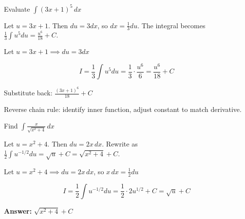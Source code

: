 
\begin{problem}
Evaluate $\displaystyle \int (3x + 1)^5 \, dx$
\end{problem}

\begin{hint}
Let $u = 3x + 1$. Then $du = 3dx$, so $dx = \frac{1}{3}du$. The integral becomes $\frac{1}{3}\int u^5 du = \frac{u^6}{18} + C$.
\end{hint}

\begin{solution}
Let $u = 3x + 1 \implies du = 3dx$

\[
I = \frac{1}{3}\int u^5 du = \frac{1}{3} \cdot \frac{u^6}{6} = \frac{u^6}{18} + C
\]

Substitute back: $\boxed{\frac{(3x+1)^6}{18} + C}$
\end{solution}

\begin{takeaways}
Reverse chain rule: identify inner function, adjust constant to match derivative.
\end{takeaways}

\vspace{1cm}

\begin{problem}
Find $\displaystyle \int \frac{x}{\sqrt{x^2 + 4}} \, dx$
\end{problem}

\begin{hint}
Let $u = x^2 + 4$. Then $du = 2x \, dx$. Rewrite as $\frac{1}{2}\int u^{-1/2} du = \sqrt{u} + C = \sqrt{x^2+4} + C$.
\end{hint}

\begin{solution}
Let $u = x^2 + 4 \implies du = 2x\,dx$, so $x\,dx = \frac{1}{2}du$

\[
I = \frac{1}{2}\int u^{-1/2} du = \frac{1}{2} \cdot 2u^{1/2} + C = \sqrt{u} + C
\]

\textbf{Answer:} $\boxed{\sqrt{x^2+4} + C}$
\end{solution}


